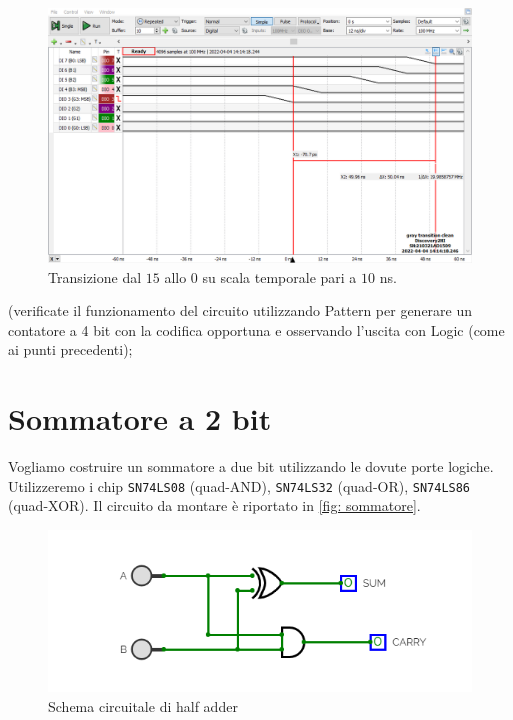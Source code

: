 \documentclass[10pt, a4paper, italian]{article}
\begin{document}
\begin{figure}[htbp]
    \centering
    \includegraphics[width=\textwidth]{gray10ns}
    \caption{Transizione dal $15$ allo $0$ su scala temporale pari a $10$ ns.}
\end{figure}
(verificate il funzionamento del circuito utilizzando Pattern per generare un contatore a 4 bit con la codifica opportuna e osservando l’uscita con Logic (come ai punti precedenti);\\


\section{Sommatore a 2 bit}
Vogliamo costruire un sommatore a due bit utilizzando le dovute porte logiche. Utilizzeremo i chip \texttt{SN74LS08} (quad-AND), \texttt{SN74LS32} (quad-OR), \texttt{SN74LS86} (quad-XOR). Il circuito da montare è riportato in \cref{fig: sommatore}.

\begin{figure}[htbp]
    \centering
    \includegraphics[width=0.6\linewidth]{half.png}
    \caption{Schema circuitale di half adder}
    \label{fig:halfadder}
\end{figure}
\end{document}
